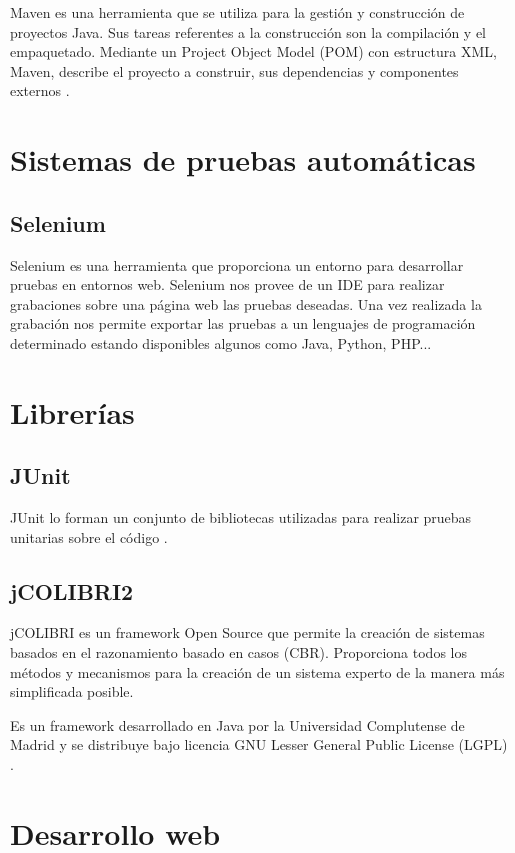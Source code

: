 Maven es una herramienta que se utiliza para la gestión y construcción de proyectos Java. Sus tareas referentes a la construcción son la compilación y el empaquetado. Mediante un Project Object Model (POM) con estructura XML, Maven, describe el proyecto a construir, sus dependencias y componentes externos \cite{maven:wiki}. 

\section{Sistemas de pruebas automáticas}

\subsection{Selenium}

Selenium es una herramienta que proporciona un entorno para desarrollar pruebas en entornos web. Selenium nos provee de un IDE para realizar grabaciones sobre una página web las pruebas deseadas. Una vez realizada la grabación nos permite exportar las pruebas a un lenguajes de programación determinado estando disponibles algunos como Java, Python, PHP... \cite{selenium:wiki}

\section{Librerías}

\subsection{JUnit}

JUnit lo forman un conjunto de bibliotecas utilizadas para realizar pruebas unitarias sobre el código \cite{junit:wiki}.

\subsection{jCOLIBRI2}

jCOLIBRI es un framework Open Source que permite la creación de sistemas basados en el razonamiento basado en casos (CBR). Proporciona todos los métodos y mecanismos para la creación de un sistema experto de la manera más simplificada posible.

Es un framework desarrollado en Java por la Universidad Complutense de Madrid y se distribuye bajo licencia GNU Lesser General Public License (LGPL) \cite{colibri:frame}.

\section{Desarrollo web}

